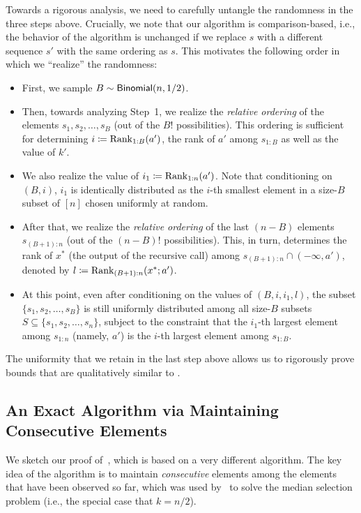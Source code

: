 Towards a rigorous analysis, we need to carefully untangle the randomness in the three steps above. Crucially, we note that our algorithm is comparison-based, i.e., the behavior of the algorithm is unchanged if we replace $s$ with a different sequence $s'$ with the same ordering as $s$. This motivates the following order in which we ``realize'' the randomness:
\begin{itemize}
    \item First, we sample $B \sim \mathsf{Binomial}(n, 1/2)$.
    \item Then, towards analyzing Step~1, we realize the \emph{relative ordering} of the elements $s_1, s_2, \ldots, s_B$ (out of the $B!$ possibilities). This ordering is sufficient for determining $i \coloneqq \mathrm{Rank}_{1:B}(a')$, the rank of $a'$ among $s_{1:B}$ as well as the value of $k'$.
    \item We also realize the value of $i_1 \coloneqq \mathrm{Rank}_{1:n}(a')$. Note that conditioning on $(B, i)$, $i_1$ is identically distributed as the $i$-th smallest element in a size-$B$ subset of $[n]$ chosen uniformly at random.
    \item After that, we realize the \emph{relative ordering} of the last $(n-B)$ elements $s_{(B+1):n}$ (out of the $(n-B)!$ possibilities). This, in turn, determines the rank of $x^*$ (the output of the recursive call) among $s_{(B+1):n} \cap (-\infty, a')$, denoted by $l \coloneqq \mathrm{Rank}_{(B+1):n}(x^*; a')$.
    \item At this point, even after conditioning on the values of $(B, i, i_1, l)$, the subset $\{s_1, s_2, \ldots, s_B\}$ is still uniformly distributed among all size-$B$ subsets $S \subseteq \{s_1, s_2, \ldots, s_n\}$, subject to the constraint that the $i_1$-th largest element among $s_{1:n}$ (namely, $a'$) is the $i$-th largest element among $s_{1:B}$. 
\end{itemize}
The uniformity that we retain in the last step above allows us to rigorously prove bounds that are qualitatively similar to .

\subsection{An Exact Algorithm via Maintaining Consecutive Elements}\label{sec:overview-exact}
We sketch our proof of~, which is based on a very different algorithm. The key idea of the algorithm is to maintain \emph{consecutive} elements among the elements that have been observed so far, which was used by~\cite{MP80} to solve the median selection problem (i.e., the special case that $k = n / 2$).

